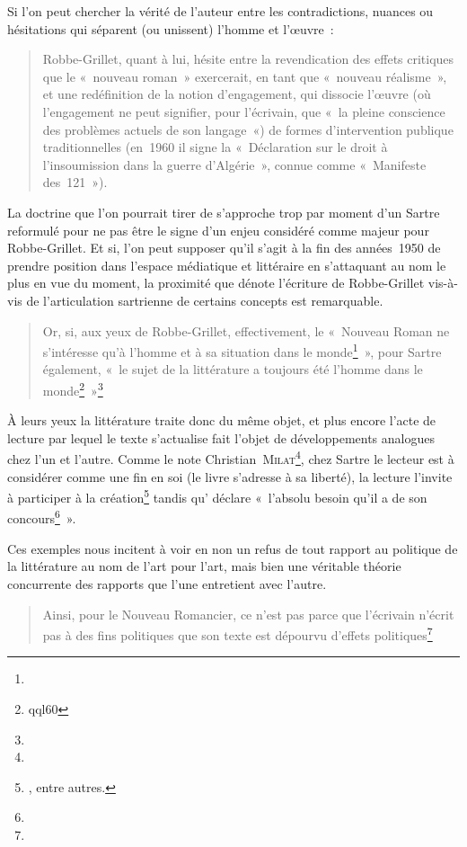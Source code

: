 Si l'on peut chercher la vérité de l'auteur entre les contradictions, nuances ou hésitations qui séparent (ou unissent) l'homme et l'œuvre~:
\begin{quote}
  Robbe-Grillet, quant à lui, hésite entre la revendication des effets critiques que le «~nouveau roman~» exercerait, en tant que «~nouveau réalisme~», et une redéfinition de la notion d’engagement, qui dissocie l’œuvre (où l’engagement ne peut signifier, pour l’écrivain, que «~la pleine conscience des problèmes actuels de son langage~«) de formes d’intervention publique traditionnelles (en~1960 il signe la «~Déclaration sur le droit à l’insoumission dans la guerre d’Algérie~», connue comme «~Manifeste des~121~»)\inte.
\end{quote}
La doctrine que l'on pourrait tirer de \punr{} s'approche trop par moment d'un Sartre reformulé pour ne pas être le signe d'un enjeu considéré comme majeur pour Robbe-Grillet. Et si, l'on peut supposer qu'il s'agit à la fin des années~1950 de prendre position dans l'espace médiatique et littéraire en s'attaquant au nom le plus en vue du moment, la proximité que dénote l'écriture de Robbe-Grillet vis-à-vis de l'articulation sartrienne de certains concepts est remarquable. 
\begin{quote}
    Or, si, aux yeux de Robbe-Grillet, effectivement, le «~Nouveau Roman ne s'intéresse qu'à l'homme et à sa situation dans le monde\footnote{}~», pour Sartre également, «~le sujet de la littérature a toujours été l'homme dans le monde\footnote{qql60}~»\footnote{}
\end{quote}
À leurs yeux la littérature traite donc du même objet, et plus encore l'acte de lecture par lequel le texte s'actualise fait l'objet de développements analogues chez l'un et l'autre. Comme le note Christian~\textsc{Milat}\footnote{}, chez Sartre le lecteur est à considérer comme une fin en soi (le livre s'adresse à sa liberté), la lecture l'invite à participer à la création\footnote{, entre autres.} tandis qu'\robbe{} déclare «~l'absolu besoin qu'il a de son concours\footnote{}~».  

Ces exemples nous incitent à voir en \punr{} non un refus de tout rapport au politique de la littérature au nom de l'art pour l'art, mais bien une véritable théorie concurrente des rapports que l'une entretient avec l'autre.
\begin{quote}
   Ainsi, pour le Nouveau Romancier, ce n'est pas parce que l'écrivain n'écrit pas à des fins politiques que son texte est dépourvu d'effets politiques\footnote{}
\end{quote}


